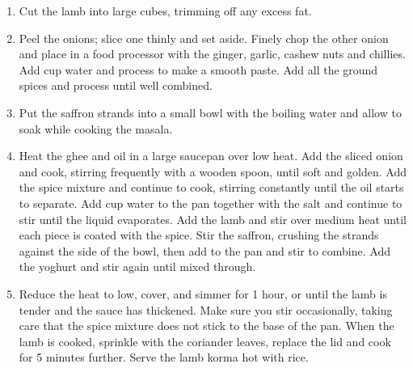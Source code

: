 \begin{enumerate}
	\item Cut the lamb into large cubes, trimming off any excess fat.
	\item Peel the onions; slice one thinly and set aside. Finely chop the other onion and place in a food processor with the ginger, garlic, cashew nuts and chillies. Add  cup water and process to make a smooth paste. Add all the ground spices and process until well combined. 
	\item Put the saffron strands into a small bowl with the boiling water and allow to soak while cooking the masala. 
	\item Heat the ghee and oil in a large saucepan over low heat. Add the sliced onion and cook, stirring frequently with a wooden spoon, until soft and golden. Add the spice mixture and continue to cook, stirring constantly until the oil starts to separate. Add  cup water to the pan together with the salt and continue to stir until the liquid evaporates. Add the lamb and stir over medium heat until each piece is coated with the spice. Stir the saffron, crushing the strands against the side of the bowl, then add to the pan and stir to combine. Add the yoghurt and stir again until mixed through. 
	\item Reduce the heat to low, cover, and simmer for 1 hour, or until the lamb is tender and the sauce has thickened. Make sure you stir occasionally, taking care that the spice mixture does not stick to the base of the pan. When the lamb is cooked, sprinkle with the coriander leaves, replace the lid and cook for 5 minutes further. Serve the lamb korma hot with rice. 
\end{enumerate}
